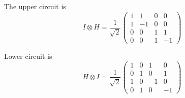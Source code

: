 \begingroup
%
\par The upper circuit is
%
$$
I \otimes H = \frac{1}{\sqrt{2}} \begin{pmatrix} 1 & 1 & 0 & 0\\ 1 & -1 & 0 & 0 \\ 0 & 0 & 1 & 1 \\ 0 & 0 & 1 & -1 \end{pmatrix}
$$
%
\par Lower circuit is
%
$$
H \otimes I = \frac{1}{\sqrt{2}} \begin{pmatrix} 1 & 0 & 1 & 0 \\ 0 & 1 & 0 & 1 \\ 1 & 0 & -1 & 0 \\ 0 & 1 & 0 & -1 \end{pmatrix}
$$
%
\endgroup
